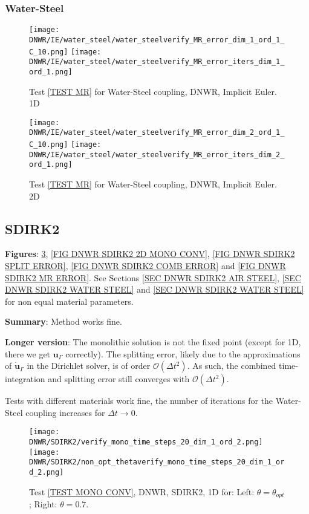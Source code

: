 \documentclass[a4paper,10pt]{article}
\begin{document}
\FloatBarrier
\subsubsection{Water-Steel}\label{SEC DNWR IE WATER STEEL}
% 

\begin{figure}[!ht]
\texttt{[image: DNWR/IE/water\_steel/water\_steelverify\_MR\_error\_dim\_1\_ord\_1\_C\_10.png]}
\texttt{[image: DNWR/IE/water\_steel/water\_steelverify\_MR\_error\_iters\_dim\_1\_ord\_1.png]}
\caption{Test \ref{TEST MR} for Water-Steel coupling, DNWR, Implicit Euler. 1D}
\label{FIG DNWR IE WATER STEEL 1D}
\end{figure}

\begin{figure}[!ht]
\texttt{[image: DNWR/IE/water\_steel/water\_steelverify\_MR\_error\_dim\_2\_ord\_1\_C\_10.png]}
\texttt{[image: DNWR/IE/water\_steel/water\_steelverify\_MR\_error\_iters\_dim\_2\_ord\_1.png]}
\caption{Test \ref{TEST MR} for Water-Steel coupling, DNWR, Implicit Euler. 2D}
\label{FIG DNWR IE WATER STEEL 2D}
\end{figure}

\FloatBarrier
\subsection{SDIRK2}\label{SEC DNWR SDIRK2}
% 
\textbf{Figures}: \ref{FIG DNWR SDIRK2 1D MONO CONV}, \ref{FIG DNWR SDIRK2 2D MONO CONV}, \ref{FIG DNWR SDIRK2 SPLIT ERROR}, \ref{FIG DNWR SDIRK2 COMB ERROR} and \ref{FIG DNWR SDIRK2 MR ERROR}. See Sections \ref{SEC DNWR SDIRK2 AIR STEEL}, \ref{SEC DNWR SDIRK2 WATER STEEL} and \ref{SEC DNWR SDIRK2 WATER STEEL} for non equal material parameters.

\textbf{Summary}: Method works fine.

\textbf{Longer version}: The monolithic solution is not the fixed point (except for 1D, there we get $\bm{u}_\Gamma$ correctly). The splitting error, likely due to the approximations of $\dot{\bm{u}}_\Gamma$ in the Dirichlet solver, is of order $\mathcal{O}(\Delta t^2)$. As such, the combined time-integration and splitting error still converges with $\mathcal{O}(\Delta t^2)$.

Tests with different materials work fine, the number of iterations for the Water-Steel coupling increases for $\Delta t \rightarrow 0$.

\begin{figure}[!ht]
\texttt{[image: DNWR/SDIRK2/verify\_mono\_time\_steps\_20\_dim\_1\_ord\_2.png]}
\texttt{[image: DNWR/SDIRK2/non\_opt\_thetaverify\_mono\_time\_steps\_20\_dim\_1\_ord\_2.png]}
\caption{Test \ref{TEST MONO CONV}, DNWR, SDIRK2, 1D for: Left: $\theta = \theta_{opt}$; Right: $\theta = 0.7$.}
\label{FIG DNWR SDIRK2 1D MONO CONV}
\end{figure}
\end{document}
